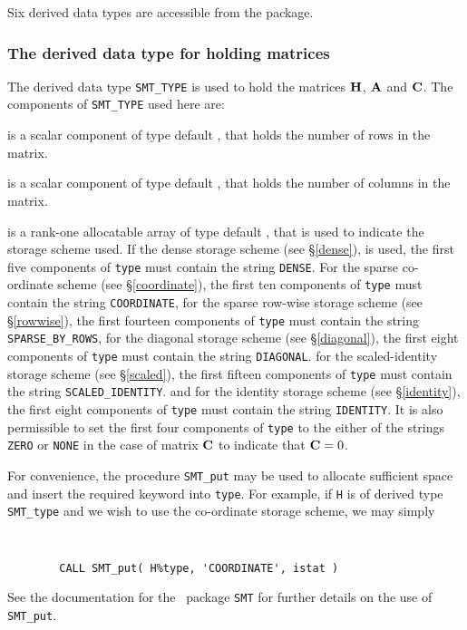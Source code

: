 \documentclass{galahad}
\begin{document}

\galtypes
Six derived data types are accessible from the package.


\subsubsection{The derived data type for holding matrices}\label{typesmt}
The derived data type {\tt SMT\_TYPE} is used to hold the matrices ${\mathbf{H}}$,
${\mathbf{A}}$ and ${\mathbf{C}}$. The components of {\tt SMT\_TYPE} used here are:

\begin{description}

 is a scalar component of type default \integer,
that holds the number of rows in the matrix.

 is a scalar component of type default \integer,
that holds the number of columns in the matrix.

 is a rank-one allocatable array of type default \character, that
is used to indicate the storage scheme used. If the dense storage scheme
(see \S\ref{dense}), is used,
the first five components of {\tt type} must contain the
string {\tt DENSE}.
For the sparse co-ordinate scheme (see \S\ref{coordinate}),
the first ten components of {\tt type} must contain the
string {\tt COORDINATE},
for the sparse row-wise storage scheme (see \S\ref{rowwise}),
the first fourteen components of {\tt type} must contain the
string {\tt SPARSE\_BY\_ROWS},
for the diagonal storage scheme (see \S\ref{diagonal}),
the first eight components of {\tt type} must contain the
string {\tt DIAGONAL}.
for the scaled-identity storage scheme (see \S\ref{scaled}),
the first fifteen components of {\tt type} must contain the
string {\tt SCALED\_IDENTITY}.
and for the identity storage scheme (see \S\ref{identity}),
the first eight components of {\tt type} must contain the
string {\tt IDENTITY}.
It is also permissible to set
the first four components of {\tt type} to the either of the strings
{\tt ZERO} or {\tt NONE}
in the case of matrix ${\mathbf{C}}$ to indicate that ${\mathbf{C}} = 0$.

For convenience, the procedure {\tt SMT\_put}
may be used to allocate sufficient space and insert the required keyword
into {\tt type}.
For example, if {\tt H} is of derived type {\tt SMT\_type}
and we wish to use the co-ordinate storage scheme, we may simply
{\tt
\begin{verbatim}
        CALL SMT_put( H%type, 'COORDINATE', istat )
\end{verbatim}
}
\noindent
See the documentation for the \galahad\ package {\tt SMT}
for further details on the use of {\tt SMT\_put}.


\end{description}
\end{document}
